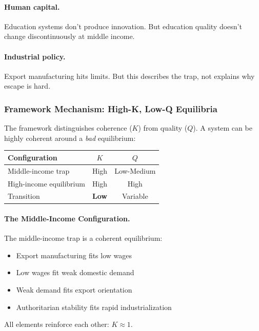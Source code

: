 \paragraph{Human capital.} Education systems don't produce innovation.
But education quality doesn't change discontinuously at middle income.

\paragraph{Industrial policy.} Export manufacturing hits limits.
But this describes the trap, not explains why escape is hard.

\subsubsection{Framework Mechanism: High-K, Low-Q Equilibria}

The framework distinguishes coherence ($K$) from quality ($Q$).
A system can be highly coherent around a \emph{bad} equilibrium:

\begin{center}
\renewcommand{\arraystretch}{1.3}
\begin{tabular}{lcc}
\hline
\textbf{Configuration} & \textbf{$K$} & \textbf{$Q$} \\
\hline
Middle-income trap & High & Low-Medium \\
High-income equilibrium & High & High \\
Transition & \textbf{Low} & Variable \\
\hline
\end{tabular}
\end{center}

\paragraph{The Middle-Income Configuration.}
The middle-income trap is a coherent equilibrium:
\begin{itemize}
  \item Export manufacturing fits low wages
  \item Low wages fit weak domestic demand
  \item Weak demand fits export orientation
  \item Authoritarian stability fits rapid industrialization
\end{itemize}

All elements reinforce each other: $K \approx 1$.

